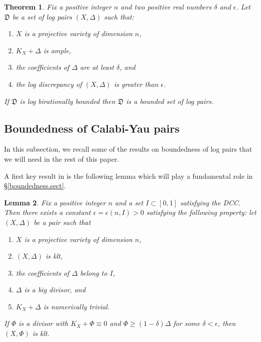 \documentclass{amsart}[12pt,a4paper]
\newtheorem{theorem}{Theorem}[section]
\newtheorem{lemma}[theorem]{Lemma}
\theoremstyle{definition}
\begin{document}
\begin{theorem}\cite[Thorem~1.6]{HMX14}\label{hmx_1.6}
	Fix a positive integer $n$ and two positive real numbers $\delta$ and $\epsilon$. 
	Let $\mathfrak{D}$ be a set of log pairs $(X,\Delta)$ such that: 
	\begin{enumerate}
		\item $X$ is a projective variety of dimension $n$,
		\item $K_{X}+\Delta$ is ample,  
		\item the coefficients of $\Delta$ are at least $\delta$, and
		\item the log discrepancy of $(X,\Delta)$ is greater than $\epsilon$.
	\end{enumerate} 
	If $\mathfrak{D}$ is log birationally bounded then $\mathfrak{D}$ is a bounded set of log pairs.
\end{theorem}

\subsection{Boundedness of Calabi-Yau pairs}
\label{bound.cyp.sect} 
In this subsection, we recall some of the results on boundedness of log pairs that we will need in the rest of this paper. 

A first key result in \cite{HMX14} is the following lemma which will play a fundamental role in \S \ref{boundedness.sect}. 

\begin{lemma}
\cite[Lemma~6.1]{HMX14}\label{kltlemma}
Fix a positive integer $n$ and a set $I \subset [0,1]$ satisfying the DCC.
Then there exists a constant $\epsilon=\epsilon(n, I)>0$ satisfying the following property: \newline 
	let $(X,\Delta)$ be a pair such that	
	\begin{enumerate}
		\item $X$ is a projective variety of dimension $n$,
		\item $(X, \Delta)$ is klt, 
		\item the coefficients of $\Delta$ belong to $I$,
		\item $\Delta$ is a big divisor, and 
		\item $K_X+\Delta$ is numerically trivial.
	\end{enumerate}
	If $\Phi$ is a divisor with $K_{X}+\Phi\equiv 0$ and $\Phi \geq (1-\delta)\Delta$ for some $\delta<\epsilon$, then $(X,\Phi)$ is klt. 
\end{lemma}
\end{document}
